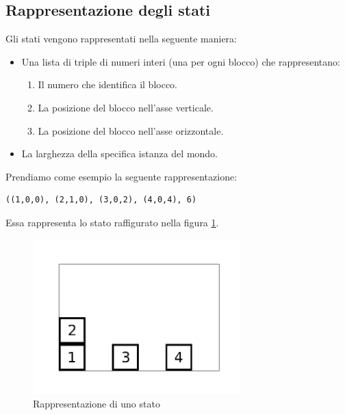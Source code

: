 \documentclass{article}
\begin{document}
	\subsection{Rappresentazione degli stati}
	Gli stati vengono rappresentati nella seguente maniera:
	\begin{itemize}
		\item Una lista di triple di numeri interi (una per ogni blocco) che rappresentano:
		\begin{enumerate}
			\item Il numero che identifica il blocco.
			\item La posizione del blocco nell'asse verticale.
			\item La posizione del blocco nell'asse orizzontale.
		\end{enumerate}
		\item La larghezza della specifica istanza del mondo.
	\end{itemize}
	Prendiamo come esempio la seguente rappresentazione:
	\begin{verbatim}
((1,0,0), (2,1,0), (3,0,2), (4,0,4), 6)
	\end{verbatim}
	Essa rappresenta lo stato raffigurato nella figura \ref{fig:state_ex}.
	\begin{figure}[H]
		\centering
		\includegraphics[width=8cm]{./images/example_state.png}
		\caption{Rappresentazione di uno stato}
		\label{fig:state_ex}
	\end{figure}
	
\end{document}
